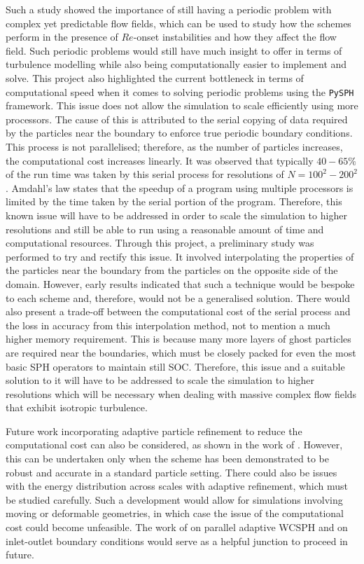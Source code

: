 Such a study showed the importance of still having a periodic problem with complex yet predictable flow fields, which can be used to study how the schemes perform in the presence of $Re$-onset instabilities and how they affect the flow field. Such periodic problems would still have much insight to offer in terms of turbulence modelling while also being computationally easier to implement and solve.
This project also highlighted the current bottleneck in terms of computational speed when it comes to solving periodic problems using the \texttt{PySPH} framework. This issue does not allow the simulation to scale efficiently using more processors. The cause of this is attributed to the serial copying of data required by the particles near the boundary to enforce true periodic boundary conditions. This process is not parallelised; therefore, as the number of particles increases, the computational cost increases linearly. It was observed that typically $40-65\%$ of the run time was taken by this serial process for resolutions of $N = 100^2-200^2$. Amdahl's law states that the speedup of a program using multiple processors is limited by the time taken by the serial portion of the program. Therefore, this known issue will have to be addressed in order to scale the simulation to higher resolutions and still be able to run using a reasonable amount of time and computational resources.
Through this project, a preliminary study was performed to try and rectify this issue. It involved interpolating the properties of the particles near the boundary from the particles on the opposite side of the domain. However, early results indicated that such a technique would be bespoke to each scheme and, therefore, would not be a generalised solution. There would also present a trade-off between the computational cost of the serial process and the loss in accuracy from this interpolation method, not to mention a much higher memory requirement. This is because many more layers of ghost particles are required near the boundaries, which must be closely packed for even the most basic SPH operators to maintain still SOC.
Therefore, this issue and a suitable solution to it will have to be addressed to scale the simulation to higher resolutions which will be necessary when dealing with massive complex flow fields that exhibit isotropic turbulence.

Future work incorporating adaptive particle refinement to reduce the computational cost can also be considered, as shown in the work of \cite{Muta2022}.
However, this can be undertaken only when the scheme has been demonstrated to be robust and accurate in a standard particle setting. There could also be issues with the energy distribution across scales with adaptive refinement, which must be studied carefully.
Such a development would allow for simulations involving moving or deformable geometries, in which case the issue of the computational cost could become unfeasible. 
The work of \cite{Haftu2022} on parallel adaptive WCSPH and \cite{negi2020improved} on inlet-outlet boundary conditions would serve as a helpful junction to proceed in future.

